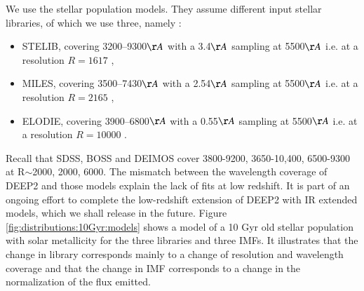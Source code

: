 \documentclass[onecolumn]{aa}
\begin{document}
We use the \citet{Maraston_2011} stellar population models. 
They assume different input stellar libraries, of which we use three, namely :
\begin{itemize}
\item STELIB, covering 3200–9300$\AA$ with a 3.4$\AA$ sampling at 5500$\AA$ i.e. at a resolution $R=1617$ \citep{leborgne2003},  
\item MILES, covering 3500–7430$\AA$ with a 2.54$\AA$ sampling at 5500$\AA$ i.e. at a resolution $R=2165$ \citep{MILES_2006,MILES_2011},
\item ELODIE, covering 3900–6800$\AA$ with a 0.55$\AA$ sampling at 5500$\AA$ i.e. at a resolution $R=10000$ \citep{Prugniel2007}.
\end{itemize}
Recall that SDSS, BOSS and DEIMOS cover 3800-9200, 3650-10,400, 6500-9300 at R$\sim$2000, 2000, 6000. The mismatch between the wavelength coverage of DEEP2 and those models explain the lack of fits at low redshift. It is part of an ongoing effort to complete the low-redshift extension of DEEP2 with IR extended models, which we shall release in the future.
Figure \ref{fig:distributions:10Gyr:models} shows a model of a 10 Gyr old stellar population with solar metallicity for the three libraries and three IMFs. It illustrates that the change in library corresponds mainly to a change of resolution and wavelength coverage and that the change in IMF corresponds to a change in the normalization of the flux emitted.
\end{document}
